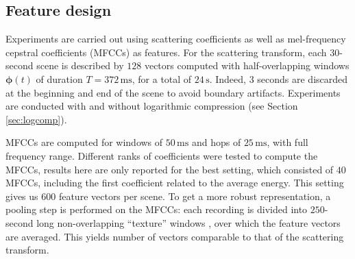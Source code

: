 \documentclass[journal]{IEEEtran}
\newcommand{\ja}[1]{\textcolor{magenta}{Joakim : #1}}
\begin{document}

\subsection{Feature design}

Experiments are carried out using scattering coefficients as well as mel-frequency cepstral coefficients (MFCCs) as features. For the scattering transform, each $30$-second scene is described by $128$ vectors computed with half-overlapping windows $\boldsymbol{\phi}(t)$ of duration $T=372\,\mathrm{ms}$, for a total of $24\,\mathrm{s}$. Indeed, $3$ seconds are discarded at the beginning and end of the scene to avoid boundary artifacts. Experiments are conducted with and without logarithmic compression (see Section \ref{sec:logcomp}).

MFCCs are computed for windows of $50\,\mathrm{ms}$ and hops of $25\,\mathrm{ms}$, with full frequency range. Different ranks of coefficients were tested to compute the MFCCs, results here are only reported for the best setting, which consisted of $40$ MFCCs, including the first coefficient related to the average energy. This setting gives us $600$ feature vectors per scene. To get a more robust representation, a pooling step is performed on the MFCCs: each recording is divided into $250$-second long non-overlapping ``texture'' windows \cite{1021072}, over which the feature vectors are averaged. This yields number of vectors comparable to that of the scattering transform.


\end{document}
